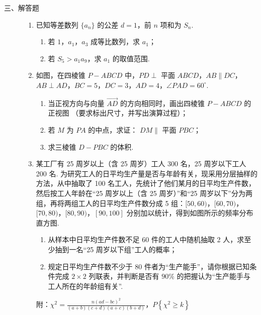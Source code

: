 \begin{description}

    \item[三、解答题]

    \begin{enumerate}[leftmargin=5pt]

      \addtocounter{enumi}{+16}

        \item 已知等差数列 \(\{a_{n}\}\) 的公差 \(d = 1\)，前 \(n\) 项和为 \(S_{n}\).
\begin{enumerate}
\item 若 \(1\)，\(a_{1}\)，\(a_{3}\) 成等比数列，求 \(a_{1}\)；
\item 若 \(S_{5} > a_{1}a_{9}\)，求 \(a_{1}\) 的取值范围.
\end{enumerate}

        \item 如图，在四棱锥 \(P-ABCD\) 中，\(PD \perp\) 平面 \(ABCD\)，\(AB \parallel DC\)，\(AB \perp AD\)，\(BC = 5\)，\(DC = 3\)，\(AD = 4\)，\(\angle PAD = 60^\circ\).
\begin{enumerate}
\item 当正视方向与向量 \( \overrightarrow{AD} \) 的方向相同时，画出四棱锥 \(P-ABCD\) 的正视图 （要求标出尺寸，并写出演算过程）；
\item 若 \(M\) 为 \(PA\) 的中点，求证： \(DM \parallel\) 平面 \(PBC\)；
\item 求三棱锥 \(D-PBC\) 的体积.
\end{enumerate}

        \item 某工厂有 25 周岁以上（含 25 周岁）工人 300 名，25 周岁以下工人 200 名. 为研究工人的日平均生产量是否与年龄有关，现采用分层抽样的方法，从中抽取了 100 名工人，先统计了他们某月的日平均生产件数，然后按工人年龄在“25 周岁以上（含 25 周岁）”和“25 周岁以下”分为两组，再将两组工人的日平均生产件数分成 5 组：\([50, 60)\)，\([60, 70)\)，\([70, 80)\)，\([80, 90)\)，\([90, 100]\) 分别加以统计，得到如图所示的频率分布直方图.

\begin{enumerate}
\item 从样本中日平均生产件数不足 60 件的工人中随机抽取 2 人，求至少抽到一名“25 周岁以下组”工人的概率；
\item 规定日平均生产件数不少于 80 件者为“生产能手”，请你根据已知条件完成 \(2\times 2\) 列联表，并判断是否有 \(90\%\) 的把握认为“生产能手与工人所在的年龄组有关”.
\end{enumerate}
附：\(\chi^2 = \frac{n(ad - bc)^2}{(a + b)(c + d)(a + c)(b + d)}\)，\(P\left\{\chi^{2} \geqslant k\right\}\)


\end{enumerate}
\end{description}
